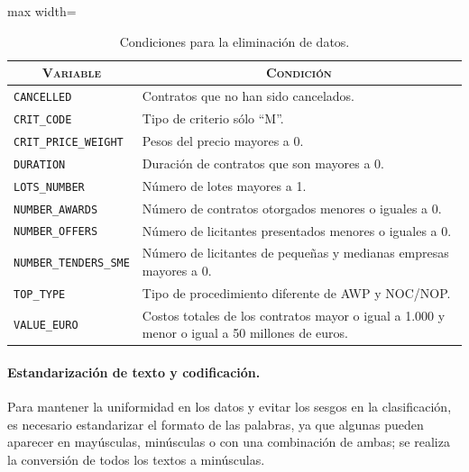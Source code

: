\documentclass[a4paper,fleqn]{cas-sc}
\begin{document}
\begin{table}[t]
	\centering
	\scriptsize
  \setlength{\tabcolsep}{7pt} 
	\renewcommand{\arraystretch}{1.3} %
	\caption{Condiciones para la eliminación de datos.}		
\begin{adjustbox}{max width=\textwidth}
	\begin{tabular}{p{3.5cm}p{9cm}}
		\hline
		\multicolumn{1}{c}{\textbf{\textsc{Variable}}} & \multicolumn{1}{c}{\textbf{\textsc{Condición}}} \\ 
		\hline
		\texttt{CANCELLED} & Contratos que no han sido cancelados. \\ 
		\texttt{CRIT\_CODE} & Tipo de criterio sólo ``M''. \\ 
		\texttt{CRIT\_PRICE\_WEIGHT} & Pesos del precio mayores a 0. \\ 
		\texttt{DURATION} & Duración de contratos que son mayores a 0.  \\ 
		\texttt{LOTS\_NUMBER} & Número de lotes mayores a 1. \\ 
		\texttt{NUMBER\_AWARDS} & Número de contratos otorgados menores o iguales a 0. \\ 
		\texttt{NUMBER\_OFFERS} & Número de licitantes presentados menores o iguales a 0.  \\ 
		\texttt{NUMBER\_TENDERS\_SME} & Número de licitantes de pequeñas y medianas empresas mayores a 0. \\ 
		\texttt{TOP\_TYPE} & Tipo de procedimiento diferente de AWP y NOC/NOP. \\ 
		\texttt{VALUE\_EURO} & Costos totales de los contratos mayor o igual a 1.000 y menor o igual a 50 millones de euros. \\ 
		\hline
	\end{tabular}
\end{adjustbox}	
	\label{tab:condiciones}
\end{table}



\paragraph{\textbf{Estandarización de texto y codificación.}}

Para mantener la uniformidad en los datos y evitar los sesgos en la clasificación, es necesario estandarizar el formato de las palabras, ya que algunas pueden aparecer en mayúsculas, minúsculas o con una combinación de ambas; se realiza la conversión de todos los textos a minúsculas. 
\end{document}
